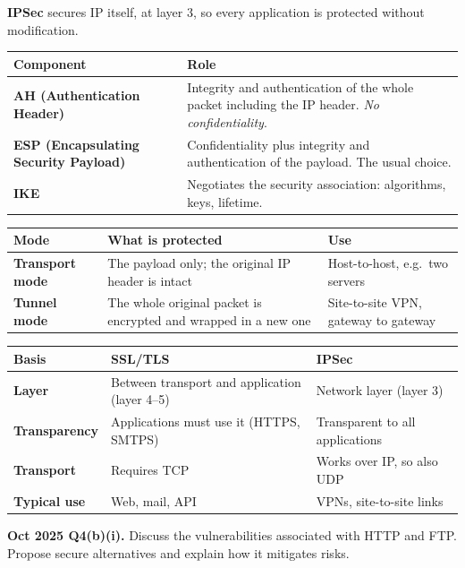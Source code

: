 \documentclass[11pt,a4paper]{article}
\begin{document}
\textbf{IPSec} secures IP itself, at layer 3, so every application is protected without modification.

\begin{center}\small
\begin{tabularx}{\textwidth}{>{\bfseries}p{} X}
\toprule Component & Role\\
\midrule
AH (Authentication Header) & Integrity and authentication of the whole packet including the IP header. \emph{No confidentiality}.\\
ESP (Encapsulating Security Payload) & Confidentiality plus integrity and authentication of the payload. The usual choice.\\
IKE & Negotiates the security association: algorithms, keys, lifetime.\\
\bottomrule
\end{tabularx}
\end{center}

\begin{center}\small
\begin{tabularx}{\textwidth}{>{\bfseries}p{} X X}
\toprule Mode & What is protected & Use\\
\midrule
Transport mode & The payload only; the original IP header is intact & Host-to-host, e.g.\ two servers\\
Tunnel mode & The whole original packet is encrypted and wrapped in a new one & Site-to-site VPN, gateway to gateway\\
\bottomrule
\end{tabularx}
\end{center}

\begin{center}\small
\begin{tabularx}{\textwidth}{>{\bfseries}p{} X X}
\toprule Basis & SSL/TLS & IPSec\\
\midrule
Layer & Between transport and application (layer 4--5) & Network layer (layer 3)\\
Transparency & Applications must use it (HTTPS, SMTPS) & Transparent to all applications\\
Transport & Requires TCP & Works over IP, so also UDP\\
Typical use & Web, mail, API & VPNs, site-to-site links\\
\bottomrule
\end{tabularx}
\end{center}

\begin{pyqbox}
\textbf{Oct 2025 Q4(b)(i).} Discuss the vulnerabilities associated with HTTP and FTP. Propose secure alternatives and explain how it mitigates risks.
\end{pyqbox}
\end{document}

